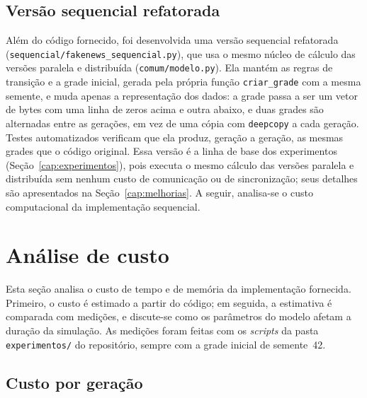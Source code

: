 \subsection{Versão sequencial refatorada}\label{sub:sequencial-refatorada}

Além do código fornecido, foi desenvolvida uma versão sequencial refatorada (\texttt{sequencial/fakenews\_sequencial.py}), que usa o mesmo núcleo de cálculo das versões paralela e distribuída (\texttt{comum/modelo.py}). Ela mantém as regras de transição e a grade inicial, gerada pela própria função \texttt{criar\_grade} com a mesma semente, e muda apenas a representação dos dados: a grade passa a ser um vetor de bytes com uma linha de zeros acima e outra abaixo, e duas grades são alternadas entre as gerações, em vez de uma cópia com \texttt{deepcopy} a cada geração. Testes automatizados verificam que ela produz, geração a geração, as mesmas grades que o código original. Essa versão é a linha de base dos experimentos (Seção~\ref{cap:experimentos}), pois executa o mesmo cálculo das versões paralela e distribuída sem nenhum custo de comunicação ou de sincronização; seus detalhes são apresentados na Seção~\ref{cap:melhorias}. A seguir, analisa-se o custo computacional da implementação sequencial.

\section{Análise de custo}\label{sec:custo-sequencial}

Esta seção analisa o custo de tempo e de memória da implementação fornecida. Primeiro, o custo é estimado a partir do código; em seguida, a estimativa é comparada com medições, e discute-se como os parâmetros do modelo afetam a duração da simulação. As medições foram feitas com os \textit{scripts} da pasta \texttt{experimentos/} do repositório, sempre com a grade inicial de semente~42.

\subsection{Custo por geração}\label{sub:custo-geracao}

